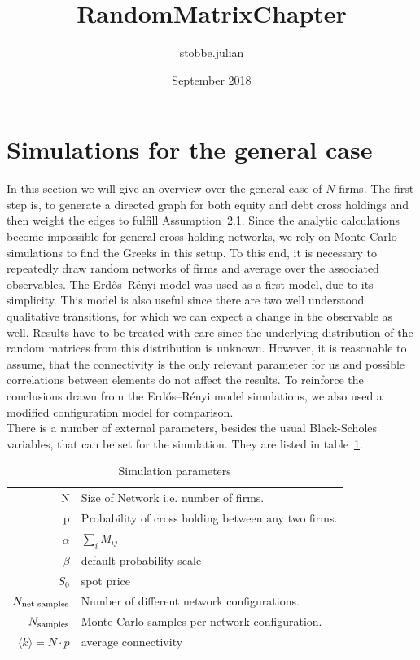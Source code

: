 \documentclass{article}
\title{RandomMatrixChapter}
\author{stobbe.julian }
\date{September 2018}
\begin{document}
\section{Simulations for the general case}
In this section we will give an overview over the general case of $N$ firms.
The first step is, to generate a directed graph for both equity and debt cross holdings and then weight the edges to fulfill Assumption~2.1.
Since the analytic calculations become impossible for general cross holding networks, we rely on Monte Carlo simulations to find the Greeks in this setup.
To this end, it is necessary to repeatedly draw random networks of firms and average over the associated observables.
The Erd\H{o}s–R\'enyi model was used as a first model, due to its simplicity.
This model is also useful since there are two well understood qualitative transitions, for which we can expect a change in the observable as well.
Results have to be treated with care since the underlying distribution of the random matrices from this distribution is unknown. 
However, it is reasonable to assume, that the connectivity is the only relevant parameter for us and possible correlations between elements do not affect the results.
To reinforce the conclusions drawn from the Erd\H{o}s–R\'enyi model simulations, we also used a modified configuration model for comparison.\\
There is a number of external parameters, besides the usual Black-Scholes variables, that can be set for the simulation. 
They are listed in table~\ref{tbl:sim_params}.
\begin{table}[h!]
    \centering
    \begin{tabular}{r|l}
      N & Size of Network i.e. number of firms. \\
      p             & Probability of cross holding between any two firms.\\
      $\alpha$      & $\sum_{i} M_{ij} $\\
      $\beta$       & default probability scale\\
      $S_0$ & spot price\\
      $N_\textnormal{net samples}$ & Number of different network configurations.\\
      $N_\textnormal{samples}$   & Monte Carlo samples per network configuration. \\
      $\langle k \rangle = N \cdot p$      & average connectivity
    \end{tabular}
    \caption{Simulation parameters}\label{tbl:sim_params}
\end{table}
\end{document}
